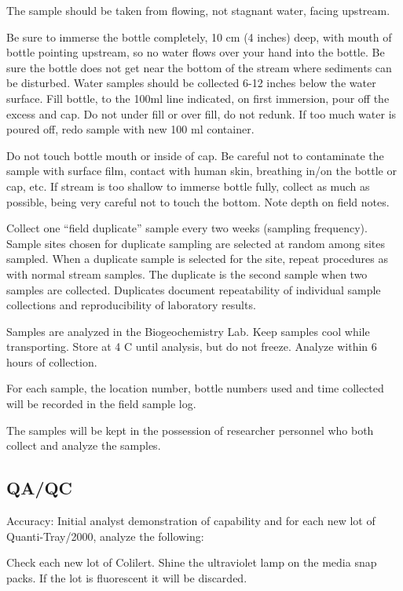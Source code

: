 \documentclass[12pt]{../SOP4_alpha}\usepackage[]{graphicx}\usepackage[]{xcolor}
\begin{document}
\NP The sample should be taken from flowing, not stagnant water, facing
upstream.

\NP Be sure to immerse the bottle completely, 10 cm (4 inches) deep, with
mouth of bottle pointing upstream, so no water flows over your hand into the
bottle. Be sure the bottle does not get near the bottom of the stream where
sediments can be disturbed. Water samples should be collected 6-12 inches
below the water surface. Fill bottle, to the 100ml line indicated, on first
immersion, pour off the excess and cap. Do not under fill or over fill, do not
redunk. If too much water is poured off, redo sample with new 100 ml
container.

\NP Do not touch bottle mouth or inside of cap. Be careful not to
contaminate the sample with surface film, contact with human skin, breathing
in/on the bottle or cap, etc. If stream is too shallow to immerse bottle fully, collect as much as possible, being very careful not to touch the bottom. Note depth on field notes.

\NP Collect one ``field duplicate'' sample every two weeks (sampling frequency).
Sample sites chosen for duplicate sampling are selected at random among
sites sampled. When a duplicate sample is selected for the site, repeat
procedures as with normal stream samples. The duplicate is the second
sample when two samples are collected. Duplicates document repeatability of
individual sample collections and reproducibility of laboratory results.

\NP Samples are analyzed in the Biogeochemistry Lab. Keep samples cool
while transporting. Store at 4 \degree C until analysis, but do not freeze. Analyze within 6 hours of collection.

\NP For each sample, the location number, bottle numbers used and time
collected will be recorded in the field sample log.

\NP The samples will be kept in the possession of researcher personnel who both collect and analyze the samples.


\subsection{QA/QC}

\NP Accuracy: Initial analyst demonstration of capability and for each new lot of Quanti-Tray/2000, analyze the following:

\NP Check each new lot of Colilert. Shine the ultraviolet lamp on the media snap packs. If the lot is fluorescent it will be discarded.
\end{document}
